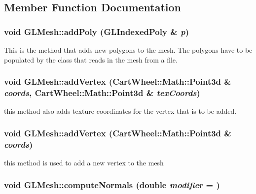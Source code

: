 \subsection{Member Function Documentation}
\hypertarget{classCartWheel_1_1GL_1_1GLMesh_a5076ff11c481e5105a6ef89931a4c2ee}{
\subsubsection[{addPoly}]{\setlength{\rightskip}{0pt plus 5cm}void GLMesh::addPoly ({\bf GLIndexedPoly} \& {\em p})}}
\label{classCartWheel_1_1GL_1_1GLMesh_a5076ff11c481e5105a6ef89931a4c2ee}
This is the method that adds new polygons to the mesh. The polygons have to be populated by the class that reads in the mesh from a file. \hypertarget{classCartWheel_1_1GL_1_1GLMesh_ac3a63d6116a6987a92e3d93fe8503917}{
\subsubsection[{addVertex}]{\setlength{\rightskip}{0pt plus 5cm}void GLMesh::addVertex ({\bf CartWheel::Math::Point3d} \& {\em coords}, \/  {\bf CartWheel::Math::Point3d} \& {\em texCoords})}}
\label{classCartWheel_1_1GL_1_1GLMesh_ac3a63d6116a6987a92e3d93fe8503917}
this method also adds texture coordinates for the vertex that is to be added. \hypertarget{classCartWheel_1_1GL_1_1GLMesh_a8709123720c14b00a4bc5399e3652f53}{
\subsubsection[{addVertex}]{\setlength{\rightskip}{0pt plus 5cm}void GLMesh::addVertex ({\bf CartWheel::Math::Point3d} \& {\em coords})}}
\label{classCartWheel_1_1GL_1_1GLMesh_a8709123720c14b00a4bc5399e3652f53}
this method is used to add a new vertex to the mesh \hypertarget{classCartWheel_1_1GL_1_1GLMesh_aba8350867124ed15f083199dbd30e09e}{
\subsubsection[{computeNormals}]{\setlength{\rightskip}{0pt plus 5cm}void GLMesh::computeNormals (double {\em modifier} = {})}}
